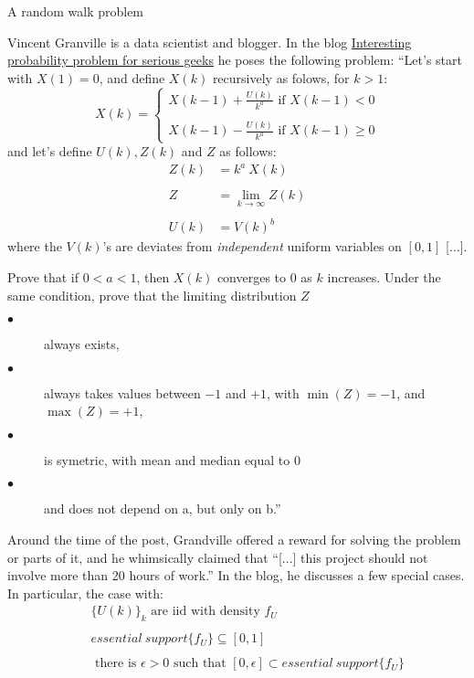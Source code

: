 \documentclass[12pt]{article}
\begin{document}
\begin{section}{A random walk problem}  
\label{sec:intro}
	
\hspace{20pt}Vincent Granville is a data scientist and blogger. In the blog \href{https://www.analyticbridge.datasciencecentral.com/profiles/blogs/interesting-probability-problem-for-serious-geeks/}{Interesting probability problem for serious geeks} he poses the following problem: 
 ``Let's start with $X(1)=0$, and define $X(k)$ recursively as folows, for $k>1$:
 $$
	X(k) = \begin{cases*}
		X(k-1) + \frac{U(k)}{k^a} \text{ if $X(k-1) < 0$} \\
		\\
		X(k-1) - \frac{U(k)}{k^a} \text{ if $X(k-1) \ge 0$} 
		\end{cases*} 
$$
and let's define $U(k), Z(k)$ and $Z$ as follows:
\begin{align*}
Z(k) &= k^a \ X(k) \\
\ \\
Z &= \lim_{k \rightarrow \infty} Z(k) \\
\ \\
U(k) &= V(k)^b 
\end{align*}
where the $V(k)$'s are deviates from \textit{independent} uniform variables on $[0,1]$ [...].  

Prove that if $0<a<1$, then $X(k)$ converges to $0$ as $k$ increases. Under the same condition, prove that the limiting distribution $Z$ 
\begin{description}
	\item[$\bullet$ ] always exists,
	\item[$\bullet$ ] always takes values between $-1$ and $+1$, with $\min(Z) = -1$, and $\max(Z) = +1$,
	\item[$\bullet$ ] is symetric, with mean and median equal to 0
	\item[$\bullet$ ] and does not depend on a, but only on b.'' 
\end{description}  


Around the time of the post, Grandville offered a reward for solving the problem or parts of it, and he whimsically claimed that ``[...] this project should not involve more than 20 hours of work.'' In the blog, he discusses a few special cases. In particular, the case with:
\begin{eqnarray} 
&& \{U(k)\}_k \text{ are iid with density }f_U  \\ 
&& \nonumber \\
&& essential \ support \{ f_U \} \subseteq [0,1] \\
&& \nonumber \\
&& \label{ref:f_U} \text{ there is $\epsilon > 0$ such that }
[0, \epsilon] \subset essential \ support \{ f_U \} 
\end{eqnarray}  


\end{section}
\end{document}
